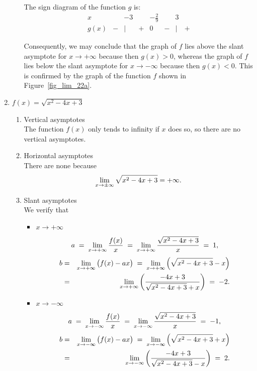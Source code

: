 \begin{example}
\begin{enumerate}
\begin{enumerate}
The sign diagram of the function $g$ is:
\[
\begin{array}{c||ccccccc}
			x &  & -3& & -\frac{2}{9}& & 3 &   \\
			\hline
			g(x) & - & | & + & 0 & - & | & + 
			\end{array}
\]

Consequently, we may conclude that the graph of $f$ lies above the slant asymptote for $x \rightarrow +\infty$ because then $g(x) > 0$, whereas the graph of $f$ lies below the slant asymptote for $x \rightarrow -\infty$ because then $g(x) < 0$. This is confirmed by the graph of the function $f$ shown in Figure~\ref{fig_lim_22a}.
\end{enumerate}
\item $f(x)=\sqrt{x^2-4x+3}$
\begin{enumerate}
\item Vertical asymptotes\\

The function $f(x)$ only tends to infinity if $x$ does so, so there are no vertical asymptotes. 
\item Horizontal asymptotes\\

There are none because
\[ \displaystyle\lim_{x \rightarrow \pm \infty} \sqrt{x^2-4x+3} = +\infty. \]

\item Slant asymptotes\\

We verify that
\begin{itemize}
\item $x\rightarrow +\infty$
\[a\; =\; \displaystyle\lim_{x \rightarrow + \infty} \dfrac{f(x)}{x}\; =\; \displaystyle\lim_{x \rightarrow + \infty} \dfrac{\sqrt{x^2-4x+3}}{x}\; =\; 1, \]
\begin{eqnarray*}
b & = & \displaystyle\lim_{x \rightarrow + \infty} \left(f(x) - ax \right)\; =\; \displaystyle\lim_{x \rightarrow + \infty} \left( \sqrt{x^2-4x+3} - x  \right)\\
& = & \displaystyle\lim_{x \rightarrow + \infty} \left( \dfrac{-4x+3}{\sqrt{x^2-4x+3} + x}\right)\; =\; -2.
\end{eqnarray*}

\item $x\rightarrow -\infty$
\[a\; =\; \displaystyle\lim_{x \rightarrow - \infty} \dfrac{f(x)}{x}\; =\; \displaystyle\lim_{x \rightarrow - \infty} \dfrac{\sqrt{x^2-4x+3}}{x}\; =\; -1, \]
\begin{eqnarray*}
b & = & \displaystyle\lim_{x \rightarrow - \infty} \left(f(x) - ax \right)\; =\; \displaystyle\lim_{x \rightarrow - \infty} \left( \sqrt{x^2-4x+3} + x  \right)\\
& = & \displaystyle\lim_{x \rightarrow - \infty} \left( \dfrac{-4x+3}{\sqrt{x^2-4x+3} - x}\right)\; =\; 2.
\end{eqnarray*}
\end{itemize}


\end{enumerate}
\end{enumerate}
\end{example}

